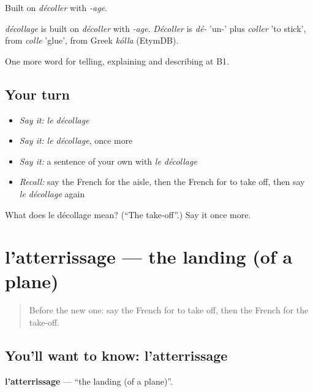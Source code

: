 Built on \emph{décoller} with \emph{-age}.

\begin{cousinweb}
\emph{décollage} is built on \emph{décoller} with \emph{-age}. \emph{Décoller} is \emph{dé-} 'un-' plus \emph{coller} 'to stick', from \emph{colle} 'glue', from Greek \emph{kólla} (EtymDB).
\end{cousinweb}

\begin{grammarlens}[title={What you've built}]
One more word for telling, explaining and describing at B1.
\end{grammarlens}

\subsection*{Your turn}
\begin{itemize}
\raggedright
  \item \emph{Say it:} \emph{le décollage}
  \item \emph{Say it:} \emph{le décollage}, once more
  \item \emph{Say it:} a sentence of your own with \emph{le décollage}
  \item \emph{Recall:} say the French for the aisle, then the French for to take off, then say \emph{le décollage} again
\end{itemize}

\begin{tcolorbox}[breakable,colback=teal!4,colframe=teal!35!black,title={Before you move on}]
What does le décollage mean? (\textquotedblleft{}The take-off\textquotedblright{}.) Say it once more.
\end{tcolorbox}
\section[l'atterrissage]{l'atterrissage — the landing (of a plane)}

\label{lesson:FR-C419-atterrissage}



\begin{quote}
Before the new one: say the French for to take off, then the French for the take-off.
\end{quote}

\subsection*{You'll want to know: l'atterrissage}
\textbf{l'atterrissage} — \textquotedblleft{}the landing (of a plane)\textquotedblright{}.

